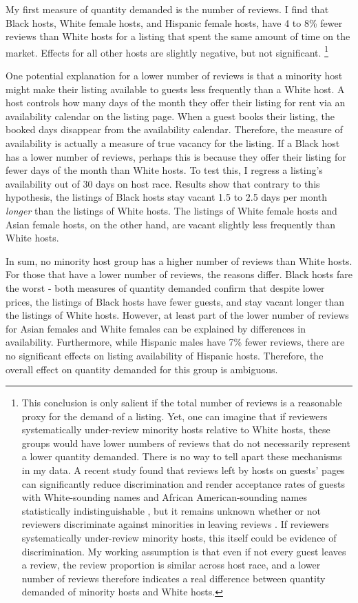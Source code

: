 My first measure of quantity demanded is the number of reviews. I find that Black hosts, White female hosts, and Hispanic female hosts, have 4 to 8\% fewer reviews than White hosts for a listing that spent the same amount of time on the market. Effects for all other hosts are slightly negative, but not significant.%
	\footnote{This conclusion is only salient if the total number of reviews is a reasonable proxy for the demand of a listing. Yet, one can imagine that if reviewers systematically under-review minority hosts relative to White hosts, these groups would have lower numbers of reviews that do not necessarily represent a lower quantity demanded. There is no way to tell apart these mechanisms in my data. A recent study found that reviews left by hosts on guests’ pages can significantly reduce discrimination and render acceptance rates of guests with White-sounding names and African American-sounding names statistically indistinguishable \citep{cui}, but it remains unknown whether or not reviewers discriminate against minorities in leaving reviews \citep{ye}. If reviewers systematically under-review minority hosts, this itself could be evidence of discrimination. My working assumption is that even if not every guest leaves a review, the review proportion is similar across host race, and a lower number of reviews therefore indicates a real difference between quantity demanded of minority hosts and White hosts.}

One potential explanation for a lower number of reviews is that a minority host might make their listing available to guests less frequently than a White host. A host controls how many days of the month they offer their listing for rent via an availability calendar on the listing page. When a guest books their listing, the booked days disappear from the availability calendar. Therefore, the measure of availability is actually a measure of true vacancy for the listing. If a Black host has a lower number of reviews, perhaps this is because they offer their listing for fewer days of the month than White hosts. To test this, I regress a listing's availability out of 30 days on host race. Results show that contrary to this hypothesis, the listings of Black hosts stay vacant 1.5 to 2.5 days per month \textit{longer} than the listings of White hosts. The listings of White female hosts and Asian female hosts, on the other hand, are vacant slightly less frequently than White hosts.

In sum, no minority host group has a higher number of reviews than White hosts. For those that have a lower number of reviews, the reasons differ. Black hosts fare the worst - both measures of quantity demanded confirm that despite lower prices, the listings of Black hosts have fewer guests, and stay vacant longer than the listings of White hosts. However, at least part of the lower number of reviews for Asian females and White females can be explained by differences in availability. Furthermore, while Hispanic males have 7\% fewer reviews, there are no significant effects on listing availability of Hispanic hosts. Therefore, the overall effect on quantity demanded for this group is ambiguous.

